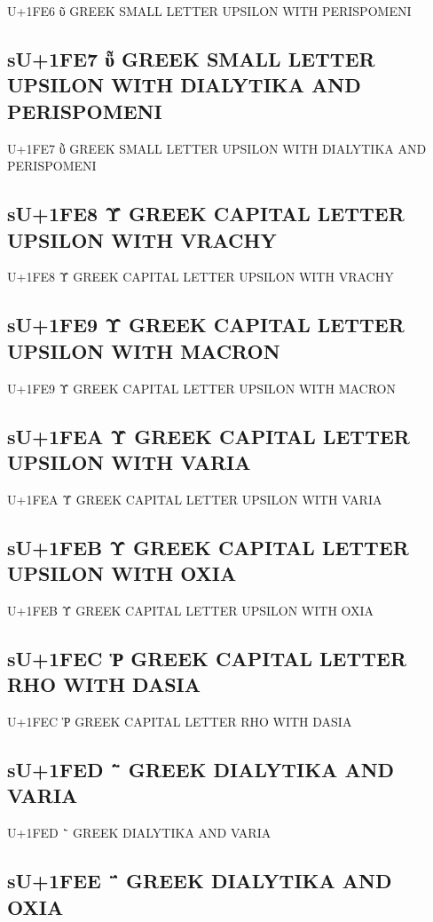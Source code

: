 U+1FE6 ῦ GREEK SMALL LETTER UPSILON WITH PERISPOMENI

\subsection{sU+1FE7 ῧ GREEK SMALL LETTER UPSILON WITH DIALYTIKA AND PERISPOMENI}

U+1FE7 ῧ GREEK SMALL LETTER UPSILON WITH DIALYTIKA AND PERISPOMENI

\subsection{sU+1FE8 Ῠ GREEK CAPITAL LETTER UPSILON WITH VRACHY}

U+1FE8 Ῠ GREEK CAPITAL LETTER UPSILON WITH VRACHY

\subsection{sU+1FE9 Ῡ GREEK CAPITAL LETTER UPSILON WITH MACRON}

U+1FE9 Ῡ GREEK CAPITAL LETTER UPSILON WITH MACRON

\subsection{sU+1FEA Ὺ GREEK CAPITAL LETTER UPSILON WITH VARIA}

U+1FEA Ὺ GREEK CAPITAL LETTER UPSILON WITH VARIA

\subsection{sU+1FEB Ύ GREEK CAPITAL LETTER UPSILON WITH OXIA}

U+1FEB Ύ GREEK CAPITAL LETTER UPSILON WITH OXIA

\subsection{sU+1FEC Ῥ GREEK CAPITAL LETTER RHO WITH DASIA}

U+1FEC Ῥ GREEK CAPITAL LETTER RHO WITH DASIA

\subsection{sU+1FED ῭ GREEK DIALYTIKA AND VARIA}

U+1FED ῭ GREEK DIALYTIKA AND VARIA

\subsection{sU+1FEE ΅ GREEK DIALYTIKA AND OXIA}

